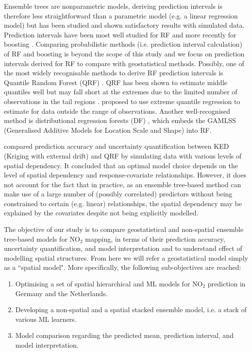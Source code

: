 \documentclass{article}
\begin{document}
Ensemble trees are nonparametric models, deriving prediction intervals is therefore less straightforward than a parametric model (e.g. a linear regression model) but has been studied and shown satisfactory results with simulated data. Prediction intervals have been most well studied for RF \citep{meinshausen2006quantile,wager2014confidence,stasinopoulos2007generalized,alakus2021rfpredinterval} and more recently for boosting \citep{duan2020ngboost,velthoen2021gradient}. Comparing probabilistic methods (i.e. prediction interval calculation) of RF and boosting is beyond the scope of this study and we focus on prediction intervals derived for RF to compare with geostatistical methods. Possibly, one of the most widely recognisable methods to derive RF prediction intervals is Quantile Random Forest (QRF) \citep{meinshausen2006quantile}. QRF has been shown to estimate middle quantiles well but may fall short at the extremes due to the limited number of observations in the tail regions \citep{velthoen2021gradient}. \cite{velthoen2021gradient} proposed to use extreme quantile regression to estimate for data outside the range of observations. Another well-recognised method is distributional regression forests (DF) \citep{schlosser2019distributional}, which embeds the GAMLSS (Generalised Additive Models for Location Scale and Shape) \citep{stasinopoulos2007generalized} into RF.  

\cite{fouedjio2019exploring} compared prediction accuracy and uncertainty quantification between KED (Kriging with external drift) and QRF by simulating data with various levels of spatial dependency. It concluded that an optimal model choice depends on the level of spatial dependency and response-covariate relationships. However, it does not account for the fact that in practice, as an ensemble tree-based method can make use of a large number of (possibly correlated) predictors without being constrained to certain (e.g. linear) relationships, the spatial dependency may be explained by the covariates despite not being explicitly modelled. 

 The objective of our study is to compare geostatistical and non-spatial ensemble tree-based models for NO$_2$ mapping, in terms of their prediction accuracy, uncertainty quantification, and model interpretation and to understand effect of modelling spatial structures. From here we will refer a geostatistical model simply as a ``spatial model". More specifically, the following sub-objectives are reached:

\begin{enumerate}
    \item Optimising a set of spatial hierarchical and ML models for NO$_2$ prediction in Germany and the Netherlands.
    
    \item Developing a non-spatial and a  spatial stacked ensemble model, i.e. a stack of various ML learners.
    \item Model comparison regarding the predicted mean, prediction interval, and model interpretation.  
\end{enumerate}
\end{document}
